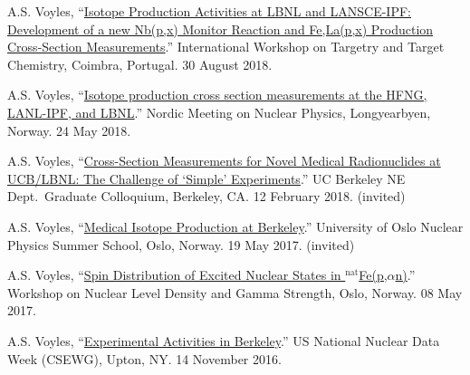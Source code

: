 \begin{bibsection}


\item A.S. Voyles, \enquote{\href{https://slideslive.com/38910297/isotope-production-activities-at-lbnl-and-lansceipf-development-of-a-new-nbpx90mo-monitor-reaction-and-felapx-production-crosssection-measurements}{Isotope Production Activities at LBNL and LANSCE-IPF: Development of a new Nb(p,x) Monitor Reaction and Fe,La(p,x) Production Cross-Section Measurements}.}  International Workshop on Targetry and Target Chemistry, Coimbra, Portugal. 30 August 2018.


\item A.S. Voyles, \enquote{\href{https://indico.cern.ch/event/686407/contributions/2943775/}{Isotope production cross section measurements at the HFNG, LANL-IPF, and LBNL}.}    Nordic Meeting on Nuclear Physics, Longyearbyen, Norway. 24 May 2018.

\item A.S. Voyles, \enquote{\href{https://github.com/avoyles/presentations/blob/master/2018-02-12-UCBNE_colloquium/Voyles_12_Feb_2018_NE_Colloquium_Talk.pdf}{Cross-Section Measurements for Novel Medical Radionuclides at UCB/LBNL: The Challenge of \enquote{Simple} Experiments}.} UC Berkeley NE Dept.\ Graduate Colloquium, Berkeley, CA. 12 February 2018. (invited)

\item A.S. Voyles, \enquote{\href{https://github.com/avoyles/presentations/blob/master/2017-05-19-oslo_summer_school/Voyles_19_May_2017_Oslo_Summer_School.pdf}{Medical Isotope Production at Berkeley}.} University of Oslo Nuclear Physics Summer School, Oslo, Norway.  19 May 2017. (invited)

\item A.S. Voyles, \enquote{\href{http://tid.uio.no/workshop2017/talks/OsloWS17_Voyles.pdf}{Spin Distribution of Excited Nuclear States in $^{\text{nat}}$Fe(p,$\alpha$n)}.}  Workshop on Nuclear Level Density and Gamma Strength, Oslo, Norway. 08 May 2017.


\item A.S. Voyles, \enquote{\href{https://indico.bnl.gov/event/1743/contributions/3189/}{Experimental Activities in Berkeley}.} US National Nuclear Data Week  (CSEWG), Upton, NY. 14 November 2016.



\end{bibsection}
